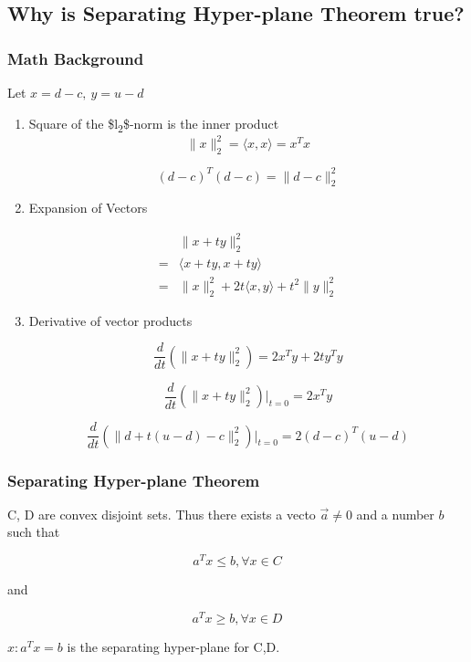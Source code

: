 \documentclass[11pt]{article}
\begin{document}
\subsection{Why is Separating Hyper-plane Theorem true?}
\label{sec:org02d8ed8}
\subsubsection{Math Background}
\label{sec:orgaa7a537}

Let \(x = d - c, \  y = u - d\)
\begin{enumerate}
\item Square of the \$l\textsubscript{2}\$-norm is the inner product
\label{sec:org369e301}
$$
\| x \|_2^2 = \langle x, x \rangle = x^T x
$$


$$
(d - c)^T (d - c) = \| d - c \|_2^2
$$
\item Expansion of Vectors
\label{sec:org5953184}

\begin{equation}
\begin{split}
& \| x + ty \|_2^2\\
= & \langle x + ty, x + ty \rangle\\
= & \| x\|_2^2 + 2t \langle x, y \rangle + t^2 \| y \|_2^2
\end{split}
\end{equation}
\item Derivative of vector products
\label{sec:orgb34d0e7}

$$
\frac{d}{dt}(\| x + ty \|_2^2) = 2 x^T y + 2t  y^T y
$$

$$
\frac{d}{dt}(\| x + ty \|_2^2)|_{t = 0 } = 2 x^T y
$$

$$
\frac{d}{dt} (\| d + t(u - d) - c \|_2^2) |_{t = 0} = 2 (d - c)^T (u - d)
$$
\end{enumerate}

\subsubsection{Separating Hyper-plane Theorem}
\label{sec:orgfc0424f}

C, D are convex disjoint sets. Thus there exists a vecto \(\vec a \neq 0\) and a
number \(b\) such that

$$
a^T x \leq b, \forall x \in C
$$

and

$$
a^T x \geq b, \forall x \in D
$$

\({x: a^T x = b}\) is the separating hyper-plane for C,D.
\end{document}
